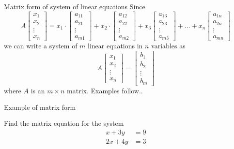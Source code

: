 \documentclass{beamer}
\begin{document}
\begin{frame}{Matrix form of system of linear equations}
  Since
  \begin{equation*}
    A\left[\begin{array}{c} x_1 \\ x_2 \\ \vdots \\ x_n\end{array} \right] = x_1\cdot \left[\begin{array}{c} a_{11} \\ a_{21} \\ \vdots \\a_{m1}\end{array} \right]+x_2\cdot \left[\begin{array}{c} a_{12} \\ a_{22} \\ \vdots \\a_{m2}\end{array} \right]+ x_3\left[\begin{array}{c} a_{13} \\ a_{23} \\ \vdots \\a_{m3}\end{array} \right] + \dots + x_n\left[\begin{array}{c} a_{1n} \\ a_{2n} \\ \vdots \\a_{mn}\end{array} \right]
  \end{equation*}
  we can write a system of $m$ linear equations in $n$ variables as 
  \begin{equation*}
    A \left[\begin{array}{c} x_1 \\ x_2 \\ \vdots \\ x_n\end{array} \right] = \left[\begin{array}{c} b_1 \\ b_2 \\ \vdots \\ b_m\end{array} \right]
  \end{equation*}
  where $A$ is an $m\times n$ matrix. Examples follow..
\end{frame}

\begin{frame}{Example of matrix form}
  \begin{example}
    Find the matrix equation for the system
    \begin{align*}
      x+3y &= 9\\
      2x+4y &= 3
    \end{align*}
  \end{example}
\end{frame}
\end{document}
